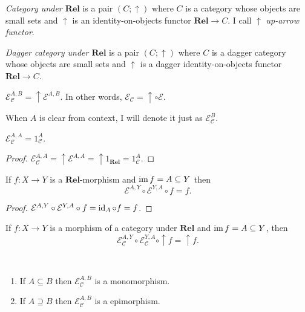 \begin{defn}
\emph{Category under $\mathbf{Rel}$} is a pair $(C ; \uparrow)$
where $C$ is a category whose objects are small sets and $\uparrow$ is an
identity-on-objects functor $\mathbf{Rel} \rightarrow C$. I call
$\uparrow$ \emph{up-arrow functor}.
\end{defn}

\begin{defn}
  \emph{Dagger category under $\mathbf{Rel}$} is a pair $(C ;
  \uparrow)$ where $C$ is a dagger category whose objects are small sets and
  $\uparrow$ is a dagger identity-on-objects functor $\mathbf{Rel}
  \rightarrow C$.
\end{defn}

\begin{defn}
  $\mathcal{E}_{\mathcal{C}}^{A,B} = \uparrow \mathcal{E}^{A,B}$. In
  other words, $\mathcal{E}_{\mathcal{C}} = \uparrow \circ \mathcal{E}$.
  
  When $A$ is clear from context, I will denote it just as $\mathcal{E}_{\mathcal{C}}^B$.
\end{defn}

\begin{prop}
  $\mathcal{E}_{\mathcal{C}}^{A,A} = 1_{\mathcal{C}}^A$.
\end{prop}

\begin{proof}
  $\mathcal{E}_{\mathcal{C}}^{A,A} = \uparrow \mathcal{E}^{A,A} =
  \uparrow 1_{\mathbf{Rel}} = 1_{\mathcal{C}}^A$.
\end{proof}

\begin{prop}
  If $f : X \rightarrow Y$ is a $\mathbf{Rel}$-morphism and
  $\operatorname{im} f = A \subseteq Y$ then
  \[ \mathcal{E}^{A,Y} \circ \mathcal{E}^{Y,A} \circ f = f. \]
\end{prop}

\begin{proof}
  $\mathcal{E}^{A,Y} \circ \mathcal{E}^{Y,A} \circ f = \operatorname{id}_A
  \circ f = f$.
\end{proof}

\begin{cor}
  If $f : X \rightarrow Y$ is a morphism of a category under
  $\mathbf{Rel}$ and $\operatorname{im} f = A \subseteq Y$, then
  \[ \mathcal{E}_{\mathcal{C}}^{A,Y} \circ \mathcal{E}_{\mathcal{C}}^{Y,A}
  \circ \uparrow f = \uparrow f. \]
\end{cor}

\begin{prop}
  ~  
  \begin{enumerate}
    \item If $A \subseteq B$ then $\mathcal{E}_{\mathcal{C}}^{A,B}$ is a
    monomorphism.
    
    \item If $A \supseteq B$ then $\mathcal{E}_{\mathcal{C}}^{A,B}$ is a
    epimorphism.
  \end{enumerate}
\end{prop}

